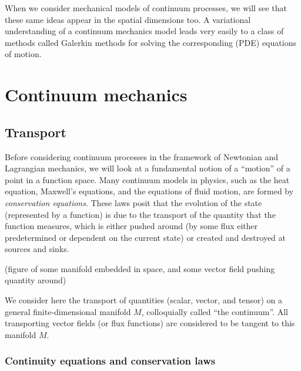\documentclass[11pt,a4paper]{memoir}
\begin{document}
When we consider mechanical models of continuum processes, we will see that these same ideas appear in the spatial dimensions too.
A variational understanding of a continuum mechanics model leads very easily to a class of methods called Galerkin methods for solving
the corresponding (PDE) equations of motion.


\chapter{Continuum mechanics}
\section{Transport} %

Before considering continuum processes in the framework of Newtonian and Lagrangian mechanics, we will look at a fundamental notion of a ``motion''
of a point in a function space. Many continuum models in physics, such as the heat equation,
Maxwell's equations, and the equations of fluid motion, are formed by \textit{conservation equations}. These laws posit that the
evolution of the state (represented by a function) is
due to the transport of the quantity that the function measures, which is either pushed around (by some flux either predetermined or dependent on the current state)
or created and destroyed at sources and sinks.

\vskip 0.2in
(figure of some manifold embedded in space, and some vector field pushing quantity around)
\vskip 0.2in

We consider here the transport of quantities (scalar, vector, and tensor) on a general finite-dimensional manifold $M$,
colloquially called ``the continuum''. All transporting vector fields (or flux functions) are considered to be tangent to this manifold $M$.

\subsection{Continuity equations and conservation laws}\label{conservation_laws}
\end{document}
